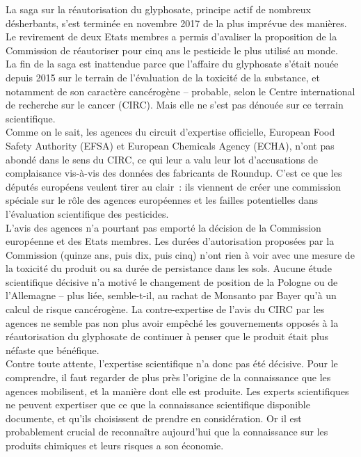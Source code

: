 \documentclass[8pt]{article}
\begin{document}
La saga sur la réautorisation du glyphosate, principe actif de nombreux désherbants, s’est terminée en novembre 2017 de la plus imprévue des manières. Le revirement de deux Etats membres a permis d’avaliser la proposition de la Commission de réautoriser pour cinq ans le pesticide le plus utilisé au monde.\\

La fin de la saga est inattendue parce que l’affaire du glyphosate s’était nouée depuis 2015 sur le terrain de l’évaluation de la toxicité de la substance, et notamment de son caractère cancérogène – probable, selon le Centre international de recherche sur le cancer (CIRC). Mais elle ne s’est pas dénouée sur ce terrain scientifique.\\

Comme on le sait, les agences du circuit d’expertise officielle, European Food Safety Authority (EFSA) et European Chemicals Agency (ECHA), n’ont pas abondé dans le sens du CIRC, ce qui leur a valu leur lot d’accusations de complaisance vis-à-vis des données des fabricants de Roundup. C’est ce que les députés européens veulent ­tirer au clair~: ils viennent de créer une commission spéciale sur le rôle des agences européennes et les failles ­potentielles dans l’évaluation scientifique des pesticides.\\

L’avis des agences n’a pourtant pas emporté la décision de la Commission européenne et des Etats membres. Les durées d’autorisation proposées par la Commission (quinze ans, puis dix, puis cinq) n’ont rien à voir avec une mesure de la toxicité du produit ou sa durée de persistance dans les sols. Aucune étude scientifique décisive n’a motivé le changement de position de la Pologne ou de l’Allemagne – plus liée, semble-t-il, au rachat de Monsanto par Bayer qu’à un calcul de risque cancérogène. La contre-expertise de l’avis du CIRC par les agences ne semble pas non plus avoir empêché les gouvernements ­opposés à la réautorisation du glyphosate de continuer à penser que le produit était plus néfaste que bénéfique.\\

Contre toute attente, l’expertise scientifique n’a donc pas été décisive. Pour le comprendre, il faut regarder de plus près l’origine de la connaissance que les agences mobilisent, et la ­manière dont elle est produite. Les ­experts scientifiques ne peuvent ­expertiser que ce que la connaissance scientifique disponible documente, et qu’ils choisissent de prendre en considération. Or il est probablement crucial de reconnaître aujourd’hui que la connaissance sur les produits chimiques et leurs risques a son économie.\\
\end{document}
